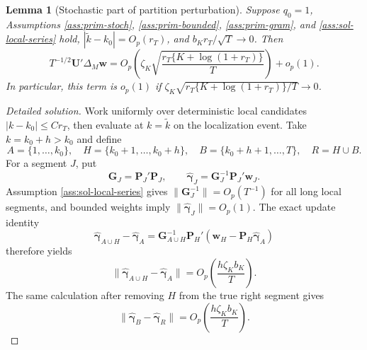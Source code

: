 \documentclass[12pt]{article}
\numberwithin{equation}{section}
\newtheorem{lemma}{Lemma}
\theoremstyle{definition}
\begin{document}
\begin{lemma}[Stochastic part of partition perturbation]
\label{lem:wb-bridge-u}
Suppose \(q_0=1\), Assumptions \ref{ass:prim-stoch},
\ref{ass:prim-bounded}, \ref{ass:prim-gram}, and
\ref{ass:sol-local-series} hold, \(|\widetilde k-k_0|=O_p(r_T)\), and
\(b_Kr_T/\sqrt T\to0\).  Then
\[
    T^{-1/2}\bm U'\Delta_M\bm w
    =
    O_p\!\left(\zeta_K\sqrt{\frac{r_T\{K+\log(1+r_T)\}}{T}}\right)+o_p(1).
\]
In particular, this term is \(o_p(1)\) if
\(\zeta_K\sqrt{r_T\{K+\log(1+r_T)\}/T}\to0\).
\end{lemma}


\begin{proof}[Detailed solution]
Work uniformly over deterministic local candidates \(|k-k_0|\leq Cr_T\),
then evaluate at \(k=\widetilde k\) on the localization event.  Take
\(k=k_0+h>k_0\) and define
\[
    A=\{1,\ldots,k_0\},\quad
    H=\{k_0+1,\ldots,k_0+h\},\quad
    B=\{k_0+h+1,\ldots,T\},\quad
    R=H\cup B.
\]
For a segment \(J\), put
\[
    \bm G_J=\bm P_J'\bm P_J,
    \qquad
    \widehat{\bm\gamma}_J=\bm G_J^{-1}\bm P_J'\bm w_J.
\]
Assumption \ref{ass:sol-local-series} gives
\(\|\bm G_J^{-1}\|=O_p(T^{-1})\) for all long local segments, and bounded
weights imply \(\|\widehat{\bm\gamma}_J\|=O_p(1)\).  The exact update
identity
\[
    \widehat{\bm\gamma}_{A\cup H}-\widehat{\bm\gamma}_A
    =\bm G_{A\cup H}^{-1}
      \bm P_H'(\bm w_H-\bm P_H\widehat{\bm\gamma}_A)
\]
therefore yields
\[
    \|\widehat{\bm\gamma}_{A\cup H}-\widehat{\bm\gamma}_A\|
    =O_p\left(\frac{h\zeta_Kb_K}{T}\right).
\]
The same calculation after removing \(H\) from the true right segment gives
\[
    \|\widehat{\bm\gamma}_{B}-\widehat{\bm\gamma}_{R}\|
    =O_p\left(\frac{h\zeta_Kb_K}{T}\right).
\]


\end{proof}
\end{document}

